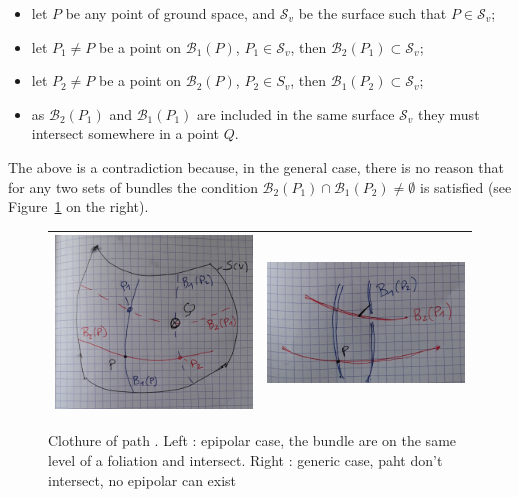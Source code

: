 \documentclass{ipol}
\newcommand{\Bund}[1]{\ensuremath{\mathcal{B}_{#1}}}
\newcommand{\BundO}{\Bund{1}}
\newcommand{\BundT}{\Bund{2}}
\newcommand{\Sv}{\ensuremath{\mathcal{S}_{v}}}
\begin{document}
\begin{itemize}
   \item  let $P$ be any point of ground space, and $\Sv$ be the surface such that $P \in \Sv$;
   \item  let $P_1 \neq P$ be a point on $\BundO(P)$, $P_1 \in \Sv$, then $\BundT(P_1) \subset \Sv$;
   \item  let $P_2 \neq P$ be a point on $\BundT(P)$, $P_2 \in S_v$, then $\BundO(P_2) \subset \Sv$;
   \item  as $\BundT(P_1)$ and $\BundO(P_1)$ are included in the same surface $\Sv$ they
            must intersect somewhere in a point $Q$.
\end{itemize}
The above is a contradiction because, in the general case, there is no reason that for any two sets
of bundles the condition $\BundT(P_1) \cap \BundO(P_2) \neq \emptyset $ is satisfied
(see Figure~\ref{FigClothPath} on the right).

\begin{figure}
\centering
\begin{tabular}{||c|c||}
 \hline \hline
\includegraphics[width=8cm]{FIGS/ClothPathEpip.jpg} &
\includegraphics[width=8cm]{FIGS/ClothPathNonEpip.jpg} 
 \\ \hline \hline
\end{tabular}
\caption{Clothure of path . Left : epipolar case, the bundle are on the same level of a foliation and intersect.
Right : generic case, paht don't intersect, no epipolar can exist}
\label{FigClothPath}
\end{figure}
\end{document}

